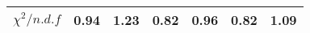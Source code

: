 \begin{table}[H]
{{\begin{tabular}{lrrrrrr}
\rule{0pt}{4ex}$\chi^2 / n.d.f$ & 0.94 & 1.23 & 0.82 & 0.96 & 0.82 & 1.09\\
\bottomrule
\end{tabular}
} %

} %
\label{tab:upsilon:result:fits}
\end{table}